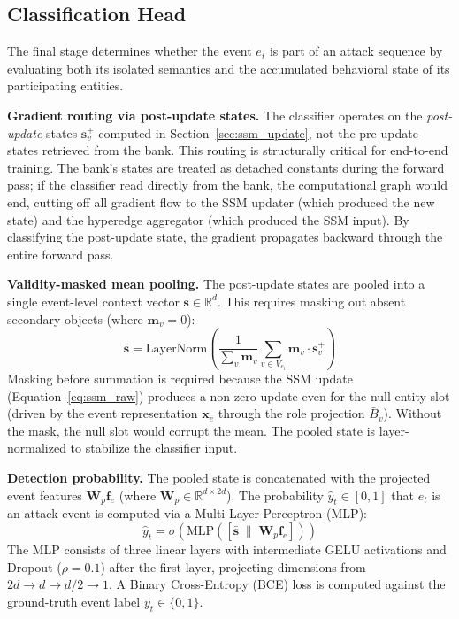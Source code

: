 \documentclass[letterpaper,twocolumn,10pt]{article}
\begin{document}
\subsection{Classification Head}
\label{sec:classification}

The final stage determines whether the event $e_t$ is part of an attack sequence by evaluating both its isolated semantics and the accumulated behavioral state of its participating entities.

\textbf{Gradient routing via post-update states.} The classifier operates on the \emph{post-update} states $\mathbf{s}_v^{+}$ computed in Section~\ref{sec:ssm_update}, not the pre-update states retrieved from the bank. This routing is structurally critical for end-to-end training. The bank's states are treated as detached constants during the forward pass; if the classifier read directly from the bank, the computational graph would end, cutting off all gradient flow to the SSM updater (which produced the new state) and the hyperedge aggregator (which produced the SSM input). By classifying the post-update state, the gradient propagates backward through the entire forward pass.

\textbf{Validity-masked mean pooling.} The post-update states are pooled into a single event-level context vector $\bar{\mathbf{s}} \in \mathbb{R}^d$. This requires masking out absent secondary objects (where $\mathbf{m}_v = 0$):
\begin{equation}
    \bar{\mathbf{s}} = \text{LayerNorm}\!\left( \frac{1}{\sum_{v} \mathbf{m}_v} \sum_{v \in V_{e_t}} \mathbf{m}_v \cdot \mathbf{s}_v^{+} \right)
\end{equation}
Masking before summation is required because the SSM update (Equation~\ref{eq:ssm_raw}) produces a non-zero update even for the null entity slot (driven by the event representation $\mathbf{x}_e$ through the role projection $\bar{B}_v$). Without the mask, the null slot would corrupt the mean. The pooled state is layer-normalized to stabilize the classifier input.

\textbf{Detection probability.} The pooled state is concatenated with the projected event features $\mathbf{W}_p \mathbf{f}_e$ (where $\mathbf{W}_p \in \mathbb{R}^{d \times 2d}$). The probability $\hat{y}_t \in [0, 1]$ that $e_t$ is an attack event is computed via a Multi-Layer Perceptron (MLP):
\begin{equation}
    \hat{y}_t = \sigma\!\left( \text{MLP}\!\left(\left[\bar{\mathbf{s}} \;\|\; \mathbf{W}_p \mathbf{f}_e\right]\right) \right)
\end{equation}
The MLP consists of three linear layers with intermediate GELU activations and Dropout ($\rho=0.1$) after the first layer, projecting dimensions from $2d \to d \to d/2 \to 1$. A Binary Cross-Entropy (BCE) loss is computed against the ground-truth event label $y_t \in \{0, 1\}$.
\end{document}
